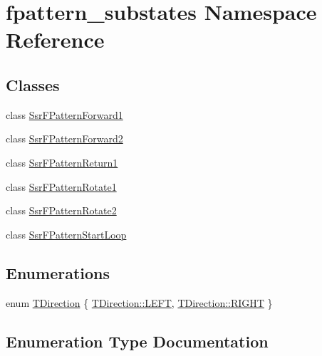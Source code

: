\hypertarget{namespacefpattern__substates}{}\section{fpattern\+\_\+substates Namespace Reference}
\label{namespacefpattern__substates}
\subsection*{Classes}
\begin{DoxyCompactItemize}
\item 
class \hyperlink{structfpattern__substates_1_1SsrFPatternForward1}{Ssr\+F\+Pattern\+Forward1}
\item 
class \hyperlink{structfpattern__substates_1_1SsrFPatternForward2}{Ssr\+F\+Pattern\+Forward2}
\item 
class \hyperlink{structfpattern__substates_1_1SsrFPatternReturn1}{Ssr\+F\+Pattern\+Return1}
\item 
class \hyperlink{structfpattern__substates_1_1SsrFPatternRotate1}{Ssr\+F\+Pattern\+Rotate1}
\item 
class \hyperlink{structfpattern__substates_1_1SsrFPatternRotate2}{Ssr\+F\+Pattern\+Rotate2}
\item 
class \hyperlink{structfpattern__substates_1_1SsrFPatternStartLoop}{Ssr\+F\+Pattern\+Start\+Loop}
\end{DoxyCompactItemize}
\subsection*{Enumerations}
\begin{DoxyCompactItemize}
\item 
enum \hyperlink{namespacefpattern__substates_a7bdf9fe5edee41378bd7192cfebe7d0e}{T\+Direction} \{ \hyperlink{namespacefpattern__substates_a7bdf9fe5edee41378bd7192cfebe7d0ea684d325a7303f52e64011467ff5c5758}{T\+Direction\+::\+L\+E\+FT}, 
\hyperlink{namespacefpattern__substates_a7bdf9fe5edee41378bd7192cfebe7d0ea21507b40c80068eda19865706fdc2403}{T\+Direction\+::\+R\+I\+G\+HT}
 \}
\end{DoxyCompactItemize}


\subsection{Enumeration Type Documentation}
